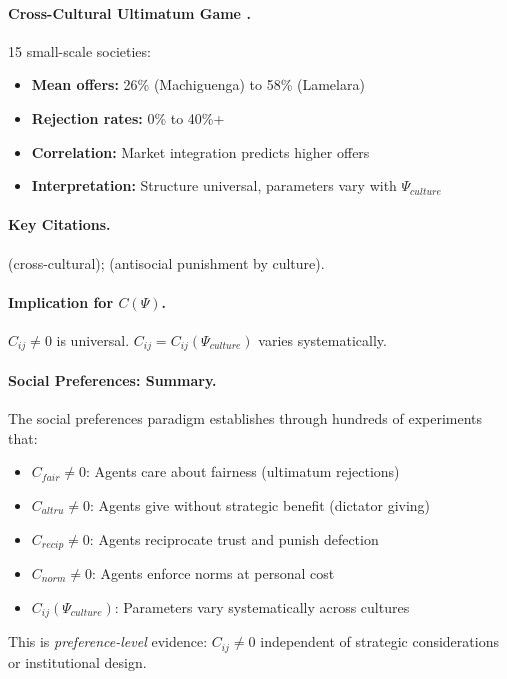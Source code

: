 \paragraph{Cross-Cultural Ultimatum Game \citep{henrich2000}.}
15 small-scale societies:
\begin{itemize}[nosep]
    \item \textbf{Mean offers:} 26\% (Machiguenga) to 58\% (Lamelara)
    \item \textbf{Rejection rates:} 0\% to 40\%+
    \item \textbf{Correlation:} Market integration predicts higher offers
    \item \textbf{Interpretation:} Structure universal, parameters vary with $\Psi_{culture}$
\end{itemize}

\paragraph{Key Citations.}
\citet{henrich2000,henrich2010} (cross-cultural); \citet{herrmannthoeni2008}
(antisocial punishment by culture).

\paragraph{Implication for $C(\Psi)$.}
$C_{ij} \neq 0$ is universal. $C_{ij} = C_{ij}(\Psi_{culture})$ varies systematically.

\paragraph{Social Preferences: Summary.}
The social preferences paradigm establishes through hundreds of experiments that:
\begin{itemize}[nosep]
    \item $C_{fair} \neq 0$: Agents care about fairness (ultimatum rejections)
    \item $C_{altru} \neq 0$: Agents give without strategic benefit (dictator giving)
    \item $C_{recip} \neq 0$: Agents reciprocate trust and punish defection
    \item $C_{norm} \neq 0$: Agents enforce norms at personal cost
    \item $C_{ij}(\Psi_{culture})$: Parameters vary systematically across cultures
\end{itemize}
This is \emph{preference-level} evidence: $C_{ij} \neq 0$ independent of
strategic considerations or institutional design.

